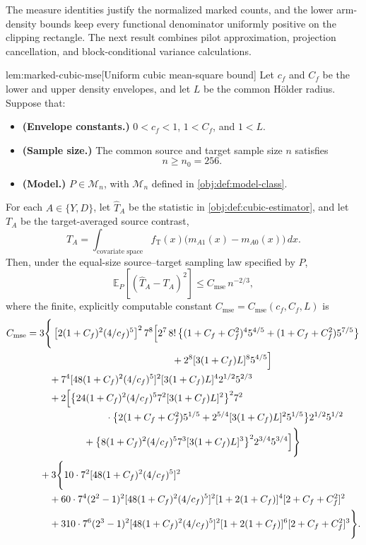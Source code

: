 \documentclass[11pt]{article}
\begin{document}
The measure identities justify the normalized marked counts, and the lower arm-density bounds keep every functional denominator uniformly positive on the clipping rectangle. The next result combines pilot approximation, projection cancellation, and block-conditional variance calculations.

\begin{lemmav}{lem:marked-cubic-mse}[Uniform cubic mean-square bound]
Let \(c_f\) and \(C_f\) be the lower and upper density envelopes, and let \(L\) be the common Hölder radius. Suppose that:
\begin{itemize}
\item \textbf{(Envelope constants.)} \(0<c_f<1\), \(1<C_f\), and \(1<L\).
\item \textbf{(Sample size.)} The common source and target sample size \(n\) satisfies
\[
n\ge n_0=256.
\]
\item \textbf{(Model.)} \(P\in\mathcal M_n\), with \(\mathcal M_n\) defined in \cref{obj:def:model-class}.
\end{itemize}
For each \(A\in\{Y,D\}\), let \(\widehat T_A\) be the statistic in \cref{obj:def:cubic-estimator}, and let \(T_A\) be the target-averaged source contrast,
\[
T_A
=
\int_{\text{covariate space}}
f_{\mathrm T}(x)\bigl(m_{A1}(x)-m_{A0}(x)\bigr)\,dx.
\]
Then, under the equal-size source–target sampling law specified by \(P\),
\[
\mathbb E_P\!\left[(\widehat T_A-T_A)^2\right]
\le C_{\mathrm{mse}}\,n^{-2/3},
\]
where the finite, explicitly computable constant \(C_{\mathrm{mse}}=C_{\mathrm{mse}}(c_f,C_f,L)\) is
\[
\begin{aligned}
C_{\mathrm{mse}}
={}&3\Bigg\{
\left[2(1+C_f)^2(4/c_f)^5\right]^2 7^8
\Big[
2^7\,8!\,
\big\{(1+C_f+C_f^2)^4 5^{4/5}
 +(1+C_f+C_f^2)5^{7/5}\big\}\\
&\hspace{48mm}
+2^8[3(1+C_f)L]^8 5^{4/5}
\Big]\\
&\quad
+7^4[48(1+C_f)^2(4/c_f)^5]^2
 [3(1+C_f)L]^4 2^{1/2}5^{2/3}\\
&\quad
+2\Big[
\big\{24(1+C_f)^2(4/c_f)^5
       7^2[3(1+C_f)L]^2\big\}^2
 7^2\\
&\hspace{24mm}\cdot
\big\{2(1+C_f+C_f^2)5^{1/5}
 +2^{5/4}[3(1+C_f)L]^2 5^{1/5}\big\}
 2^{1/2}5^{1/2}\\
&\hspace{16mm}
+\big\{8(1+C_f)^2(4/c_f)^5
       7^3[3(1+C_f)L]^3\big\}^2
 2^{3/4}5^{3/4}
\Big]
\Bigg\}\\
&+3\Bigg\{
10\cdot7^2[48(1+C_f)^2(4/c_f)^5]^2\\
&\quad
+60\cdot7^4(2^2-1)^2
 [48(1+C_f)^2(4/c_f)^5]^2
 [1+2(1+C_f)]^4[2+C_f+C_f^2]^2\\
&\quad
+310\cdot7^6(2^3-1)^2
 [48(1+C_f)^2(4/c_f)^5]^2
 [1+2(1+C_f)]^6[2+C_f+C_f^2]^3
\Bigg\}.
\end{aligned}
\]
\end{lemmav}
\end{document}
